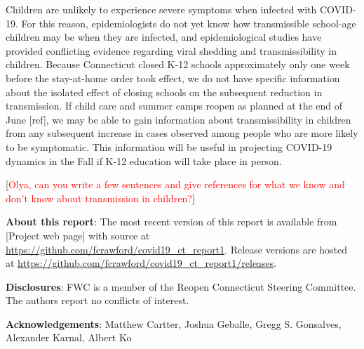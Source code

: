 \documentclass[11pt]{article}
\newcommand{\comment}[1]{[\textcolor{red}{#1}]}
\begin{document}
Children are unlikely to experience severe symptoms when infected with COVID-19. For this reason, epidemiologists do not yet know how transmissible school-age children may be when they are infected, and epidemiological studies have provided conflicting evidence regarding viral shedding and transmissibility in children. Because Connecticut closed K-12 schools approximately only one week before the stay-at-home order took effect, we do not have specific information about the isolated effect of closing schools on the subsequent reduction in transmission.  If child care and summer camps reopen as planned at the end of June [ref], we may be able to gain information about transmissibility in children from any subsequent increase in cases observed among people who are more likely to be symptomatic.  This information will be useful in projecting COVID-19 dynamics in the Fall if K-12 education will take place in person. 


\comment{Olya, can you write a few sentences and give references for what we know and don't know about transmission in children?}







\textbf{About this report}: The most recent version of this report is available from [Project web page] with source at \url{https://github.com/fcrawford/covid19_ct_report1}. Release versions are hosted at \url{https://github.com/fcrawford/covid19_ct_report1/releases}. 



\textbf{Disclosures}: FWC is a member of the Reopen Connecticut Steering Committee.  The authors report no conflicts of interest. 



\textbf{Acknowledgements}:
Matthew Cartter,
Joshua Geballe,
Gregg S. Gonsalves,
Alexander Karnal,
Albert Ko 






\end{document}
